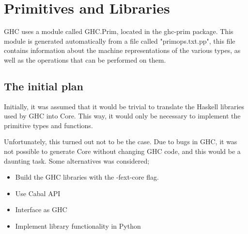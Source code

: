 

\chapter{Primitives and Libraries}


\begin{comment}
"Over the fifteen years of its life so far, GHC has grown a huge num-
ber of features. It supports dozens of language extensions (notably
in the type system), an interactive read/eval/print interface (GHCi),
concurrency (Peyton Jones et al., 1996; Marlow et al., 2004), trans-
actional memory (Harris et al., 2005), Template Haskell (Sheard
and Peyton Jones, 2002), support for packages, and much more be-
sides. This makes GHC a dauntingly complex beast to understand
and modify and, mainly for that reason, development of the core
GHC functionality remains with Peyton Jones and Simon Marlow,
who both moved to Microsoft Research in 1997." - (A History of Haskell: Being lazy pp.29)
\end{comment}

GHC uses a module called GHC.Prim, located in the ghc-prim package. This
module is generated automatically from a file called "primops.txt.pp", this file
contains information about the machine representations of the various types, as
well as the operations that can be performed on them.

\section{The initial plan}

Initially, it was assumed that it would be trivial to translate the Haskell
libraries used by GHC into Core. This way, it would only be necessary to implement
the primitive types and functions.

Unfortunately, this turned out not to be the case. Due to bugs in GHC, it was not 
possible to generate Core without changing GHC code, and this would be a daunting task.
Some alternatives was considered;

\begin{itemize}

\item Build the GHC libraries with the -fext-core flag.

\item Use Cabal API

\item Interface as GHC

\item Implement library functionality in Python

\end{itemize}

